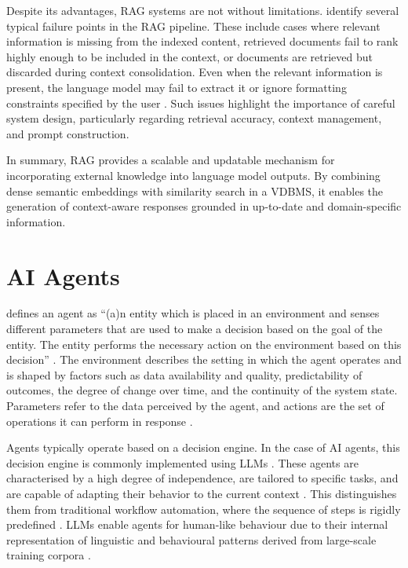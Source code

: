 \documentclass[a4paper,oneside,bibliography=totoc]{scrbook}
\begin{document}
Despite its advantages, RAG systems are not without limitations. \citet{Barnett2024} identify several typical failure points in the RAG pipeline. These include cases where relevant information is missing from the indexed content, retrieved documents fail to rank highly enough to be included in the context, or documents are retrieved but discarded during context consolidation. Even when the relevant information is present, the language model may fail to extract it or ignore formatting constraints specified by the user \cite{Barnett2024}. Such issues highlight the importance of careful system design, particularly regarding retrieval accuracy, context management, and prompt construction.

In summary, \ac{RAG} provides a scalable and updatable mechanism for incorporating external knowledge into language model outputs. By combining dense semantic embeddings with similarity search in a \ac{VDBMS}, it enables the generation of context-aware responses grounded in up-to-date and domain-specific information.

\section{AI Agents}
\label{sec:ai_agents}

\citet{Dorri2018} defines an agent as \enquote{(a)n entity which is placed in an environment and senses different parameters that are used to make a decision based on the goal of the entity. The entity performs the necessary action on the environment based on this decision} \cite[S. 28574]{Dorri2018}. The environment describes the setting in which the agent operates and is shaped by factors such as data availability and quality, predictability of outcomes, the degree of change over time, and the continuity of the system state. Parameters refer to the data perceived by the agent, and actions are the set of operations it can perform in response \cite{Dorri2018}.

Agents typically operate based on a decision engine. In the case of \ac{AI} agents, this decision engine is commonly implemented using \acp{LLM} \cite{Sapkota2025,Park2023}. These agents are characterised by a high degree of independence, are tailored to specific tasks, and are capable of adapting their behavior to the current context \cite{Sapkota2025,OpenAI2025}. This distinguishes them from traditional workflow automation, where the sequence of steps is rigidly predefined \cite{Anthropic2024}. \acp{LLM} enable agents for human-like behaviour due to their internal representation of linguistic and behavioural patterns derived from large-scale training corpora \cite{Park2023}.
\end{document}
